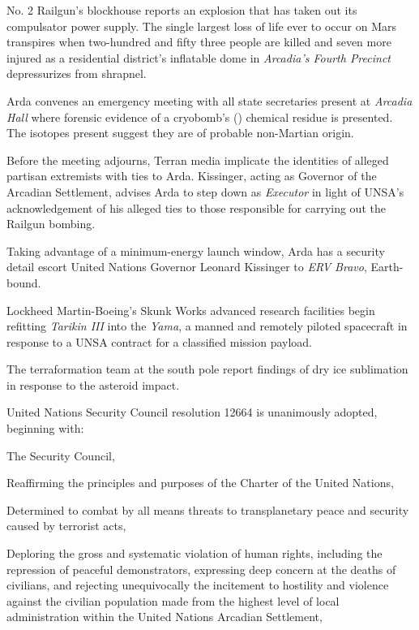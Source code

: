 No. \type{#}2 Railgun's blockhouse reports an explosion that has taken out its compulsator power supply. The single largest loss of life ever to occur on Mars transpires when two-hundred and fifty three people are killed and seven more injured as a residential district's inflatable dome in {\it Arcadia's Fourth Precinct} depressurizes from shrapnel.

Arda convenes an emergency meeting with all state secretaries present at {\it Arcadia Hall} where forensic evidence of a cryobomb's () chemical residue is presented. The isotopes present suggest they are of probable non-Martian origin. 

Before the meeting adjourns, Terran media implicate the identities of alleged partisan extremists with ties to Arda. Kissinger, acting as Governor of the Arcadian Settlement, advises Arda to step down as {\it Executor} in light of UNSA's acknowledgement of his alleged ties to those responsible for carrying out the Railgun bombing.
\StopTimelineDate

Taking advantage of a minimum-energy launch window, Arda has a security detail escort United Nations Governor Leonard Kissinger to {\it ERV Bravo}, Earth-bound.
\StopTimelineDate

Lockheed Martin-Boeing's Skunk Works advanced research facilities begin refitting {\it Tarikin III} into the {\it Yama}, a manned and remotely piloted spacecraft in response to a UNSA contract for a classified mission payload.
\StopTimelineDate

The terraformation team at the south pole report findings of dry ice sublimation in response to the asteroid impact.
\StopTimelineDate

United Nations Security Council resolution 12664 is unanimously adopted, beginning with:

\startTimelineDocument
The Security Council,

Reaffirming the principles and purposes of the Charter of the United Nations,

Determined to combat by all means threats to transplanetary peace and security caused by terrorist acts,

Deploring the gross and systematic violation of human rights, including the repression of peaceful demonstrators, expressing deep concern at the deaths of civilians, and rejecting unequivocally the incitement to hostility and violence against the civilian population made from the highest level of local administration within the United Nations Arcadian Settlement,

